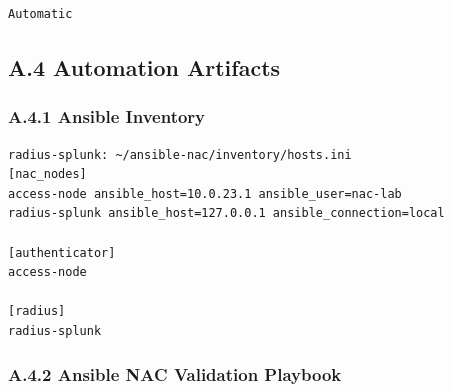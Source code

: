 \documentclass[11pt]{article}
\begin{document}
\begin{verbatim}
Automatic
\end{verbatim}


\subsection{A.4 Automation Artifacts}
\label{sec:appendix-a-automation-artifacts}


\subsubsection{A.4.1 Ansible Inventory}
\label{sec:appendix-a-ansible-inventory-hosts-ini}

\begin{verbatim}
radius-splunk: ~/ansible-nac/inventory/hosts.ini
[nac_nodes]
access-node ansible_host=10.0.23.1 ansible_user=nac-lab
radius-splunk ansible_host=127.0.0.1 ansible_connection=local

[authenticator]
access-node

[radius]
radius-splunk
\end{verbatim}


\subsubsection{A.4.2 Ansible NAC Validation Playbook}
\label{sec:appendix-a-ansible-nac-validation-playbook}
\end{document}
